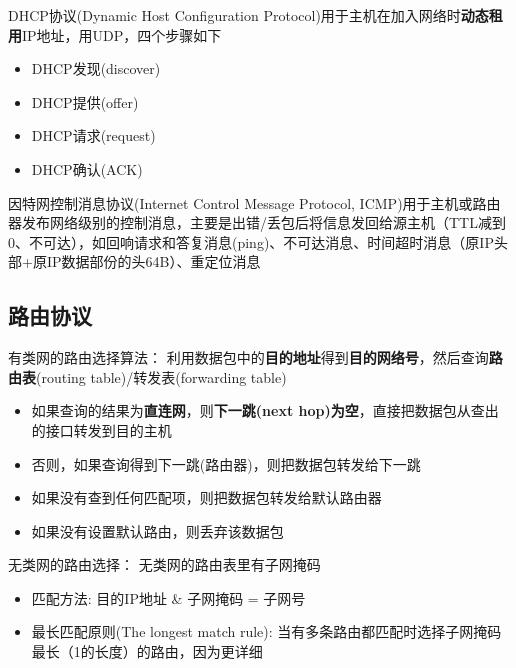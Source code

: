 DHCP协议(Dynamic Host Configuration Protocol)用于主机在加入网络时\textbf{动态租用}IP地址，用UDP，四个步骤如下
\begin{itemize}
	\item DHCP发现(discover)
	\item DHCP提供(offer)
	\item DHCP请求(request)
	\item DHCP确认(ACK)
\end{itemize}

因特网控制消息协议(Internet Control Message Protocol, ICMP)用于主机或路由器发布网络级别的控制消息，主要是出错/丢包后将信息发回给源主机（TTL减到0、不可达），如回响请求和答复消息(ping)、不可达消息、时间超时消息（原IP头部+原IP数据部份的头64B）、重定位消息

\subsection{路由协议}
有类网的路由选择算法：
利用数据包中的\textbf{目的地址}得到\textbf{目的网络号}，然后查询\textbf{路由表}(routing table)/转发表(forwarding table)
\begin{itemize}
	\item 如果查询的结果为\textbf{直连网}，则\textbf{下一跳(next hop)为空}，直接把数据包从查出的接口转发到目的主机
	\item 否则，如果查询得到下一跳(路由器)，则把数据包转发给下一跳
	\item 如果没有查到任何匹配项，则把数据包转发给默认路由器
	\item 如果没有设置默认路由，则丢弃该数据包
\end{itemize}

无类网的路由选择：
无类网的路由表里有子网掩码
\begin{itemize}
	\item 匹配方法: 目的IP地址 \& 子网掩码 = 子网号
	\item 最长匹配原则(The longest match rule): 当有多条路由都匹配时选择子网掩码最长（1的长度）的路由，因为更详细
\end{itemize}